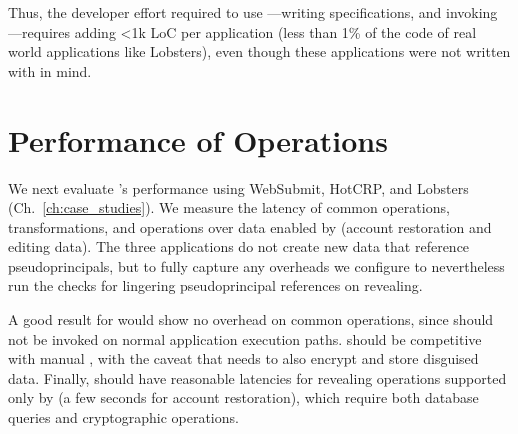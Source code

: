 Thus, the developer effort required to use \sys---writing \sys specifications,
and invoking \sys---requires adding <1k LoC per application (less than 1\% of
the code of real world applications like Lobsters), even though these
applications were not written with \sys in mind.

\section{Performance of \sys Operations}
\label{s:eval-ops}

%
We next evaluate \sys's performance using WebSubmit,
HotCRP, and Lobsters (Ch.~\ref{ch:case_studies}).
%
%
We measure the latency of common operations, \xxing transformations, and
operations over \xxed data enabled by \sys (\eg account restoration and editing
\xxed data).
%
The three applications do not create new data that reference pseudoprincipals,
but to fully capture any overheads we configure \sys to nevertheless run the
checks for lingering pseudoprincipal references on revealing.
%

%
A good result for \sys would show no overhead on common operations, since \sys
should not be invoked on normal application execution paths.
%
\sys should be competitive with manual \xxing, with the caveat that \sys needs
to also encrypt and store disguised data.
%
Finally, \sys should have reasonable latencies for revealing operations
supported only by \sys (\eg a few seconds for account restoration), which
require both database queries and cryptographic operations. 
%

